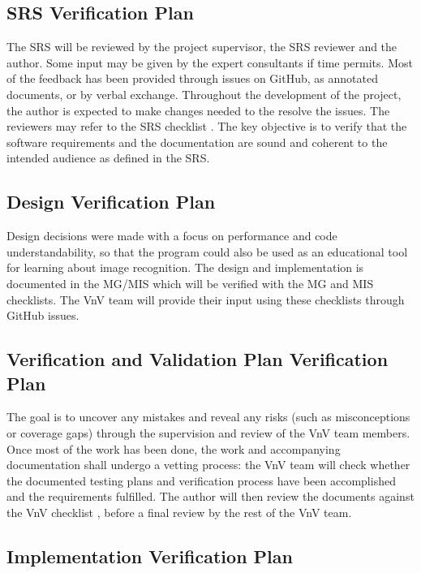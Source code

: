 \documentclass[12pt, titlepage]{article}
\begin{document}
\subsection{SRS Verification Plan}

The SRS will be reviewed by the project supervisor, the SRS reviewer and the author. Some input
may be given by the expert consultants if time permits. Most of the feedback has been provided 
through issues on GitHub, as annotated documents, or by verbal exchange. 
Throughout the development of the project, the author is expected 
to make changes needed to the resolve the issues. The reviewers may refer to the SRS checklist \citep{SRS_checklist}.
The key objective is to verify that the software requirements and the documentation are sound 
and coherent to the intended audience as defined in the SRS.

\subsection{Design Verification Plan}

Design decisions were made with a focus on performance and code understandability, so that the program could also be used 
as an educational tool for learning about image recognition. The design and implementation is documented in the 
MG\citep{MG}/MIS\citep{MIS} which will be verified with the MG \cite{MG_checklist}
and MIS \cite{MIS_checklist} checklists.
The VnV team will provide their input using these checklists through GitHub issues. 

\subsection{Verification and Validation Plan Verification Plan}

The goal is to uncover any mistakes and reveal any risks (such as misconceptions or coverage gaps) 
through the supervision and 
review of the VnV team members. Once most of the work has been done, the work and
accompanying documentation shall undergo a vetting process: the VnV team
will check whether the documented testing plans and verification process have been 
accomplished and the requirements fulfilled. The author will then review the documents
against the VnV checklist \citep{VnV_checklist}, before a final review by the rest of the VnV team.

\subsection{Implementation Verification Plan}
\end{document}
